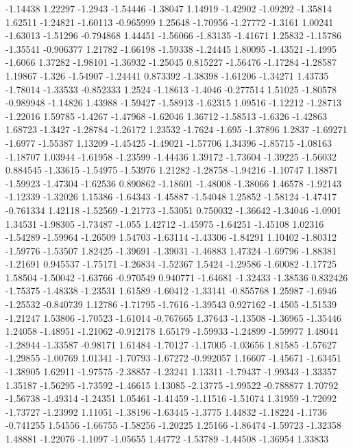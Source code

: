 \documentclass[9pt]{article}
\theoremstyle{plain}
\theoremstyle{definition}
\theoremstyle{remark}
\numberwithin{equation}{section}
\begin{document}
-1.14438
1.22297
-1.2943
-1.54446
-1.38047
1.14919
-1.42902
-1.09292
-1.35814
1.62511
-1.24821
-1.60113
-0.965999
1.25648
-1.70956
-1.27772
-1.3161
1.00241
-1.63013
-1.51296
-0.794868
1.44451
-1.56066
-1.83135
-1.41671
1.25832
-1.15786
-1.35541
-0.906377
1.21782
-1.66198
-1.59338
-1.24445
1.80095
-1.43521
-1.4995
-1.6066
1.37282
-1.98101
-1.36932
-1.25045
0.815227
-1.56476
-1.17284
-1.28587
1.19867
-1.326
-1.54907
-1.24441
0.873392
-1.38398
-1.61206
-1.34271
1.43735
-1.78014
-1.33533
-0.852333
1.2524
-1.18613
-1.4046
-0.277514
1.51025
-1.80578
-0.989948
-1.14826
1.43988
-1.59427
-1.58913
-1.62315
1.09516
-1.12212
-1.28713
-1.22016
1.59785
-1.4267
-1.47968
-1.62046
1.36712
-1.58513
-1.6326
-1.42863
1.68723
-1.3427
-1.28784
-1.26172
1.23532
-1.7624
-1.695
-1.37896
1.2837
-1.69271
-1.6977
-1.55387
1.13209
-1.45425
-1.49021
-1.57706
1.34396
-1.85715
-1.08163
-1.18707
1.03944
-1.61958
-1.23599
-1.44436
1.39172
-1.73604
-1.39225
-1.56032
0.884545
-1.33615
-1.54975
-1.53976
1.21282
-1.28758
-1.94216
-1.10747
1.18871
-1.59923
-1.47304
-1.62536
0.890862
-1.18601
-1.48008
-1.38066
1.46578
-1.92143
-1.12339
-1.32026
1.15386
-1.64343
-1.45887
-1.54048
1.25852
-1.58124
-1.47417
-0.761334
1.42118
-1.52569
-1.21773
-1.53051
0.750032
-1.36642
-1.34046
-1.0901
1.34531
-1.98305
-1.73487
-1.055
1.42712
-1.45975
-1.64251
-1.45108
1.02316
-1.54289
-1.59964
-1.26509
1.54703
-1.63114
-1.43306
-1.84291
1.10402
-1.80312
-1.59776
-1.53507
1.82425
-1.39691
-1.39031
-1.46883
1.47324
-1.69796
-1.88381
-1.21691
0.945537
-1.75171
-1.26834
-1.52367
1.5424
-1.29586
-1.60082
-1.17725
1.58504
-1.50042
-1.63766
-0.970549
0.940771
-1.64681
-1.32433
-1.38536
0.832426
-1.75375
-1.48338
-1.23531
1.61589
-1.60412
-1.33141
-0.855768
1.25987
-1.6946
-1.25532
-0.840739
1.12786
-1.71795
-1.7616
-1.39543
0.927162
-1.4505
-1.51539
-1.21247
1.53806
-1.70523
-1.61014
-0.767665
1.37643
-1.13508
-1.36965
-1.35446
1.24058
-1.48951
-1.21062
-0.912178
1.65179
-1.59933
-1.24899
-1.59977
1.48044
-1.28944
-1.33587
-0.98171
1.61484
-1.70127
-1.17005
-1.03656
1.81585
-1.57627
-1.29855
-1.00769
1.01341
-1.70793
-1.67272
-0.992057
1.16607
-1.45671
-1.63451
-1.38905
1.62911
-1.97575
-2.38857
-1.23241
1.13311
-1.79437
-1.99343
-1.33357
1.35187
-1.56295
-1.73592
-1.46615
1.13085
-2.13775
-1.99522
-0.788877
1.70792
-1.56738
-1.49314
-1.24351
1.05461
-1.41459
-1.11516
-1.51074
1.31959
-1.72092
-1.73727
-1.23992
1.11051
-1.38196
-1.63445
-1.3775
1.44832
-1.18224
-1.1736
-0.741255
1.54556
-1.66755
-1.58256
-1.20225
1.25166
-1.86474
-1.59723
-1.32358
1.48881
-1.22076
-1.1097
-1.05655
1.44772
-1.53789
-1.44508
-1.36954
1.33833
\end{document}
